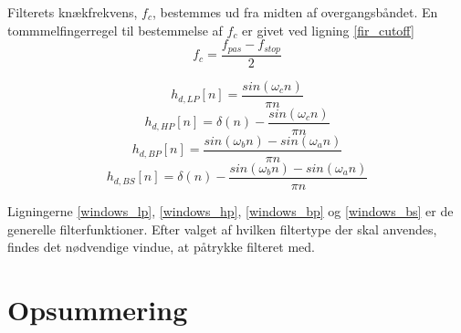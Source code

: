 Filterets knækfrekvens, $f_c$, bestemmes ud fra midten af overgangsbåndet. En tommmelfingerregel til bestemmelse af $f_c$ er givet ved ligning \ref{fir_cutoff}
\begin{equation}
	f_c =\frac{f_{pas}-f_{stop}}{2} \label{fir_cutoff}
\end{equation}




\begin{equation}
h_{d,LP}[n] = \frac{sin(\omega_c n)}{\pi n} \label{windows_lp}
\end{equation}
\begin{equation}
h_{d,HP}[n] = \delta(n) - \frac{sin(\omega_c n)}{\pi n} \label{windows_hp}
\end{equation}
\begin{equation}
h_{d,BP}[n] = \frac{sin(\omega_b n) - sin(\omega_a n)}{\pi n} \label{windows_bp}
\end{equation}
\begin{equation}
h_{d,BS}[n] = \delta(n) - \frac{sin(\omega_b n) - sin(\omega_a n)}{\pi n} \label{windows_bs}
\end{equation}

Ligningerne \ref{windows_lp}, \ref{windows_hp}, \ref{windows_bp} og \ref{windows_bs} er de generelle filterfunktioner. Efter valget af hvilken filtertype der skal anvendes, findes det nødvendige vindue, at påtrykke filteret med.


\section{Opsummering}

